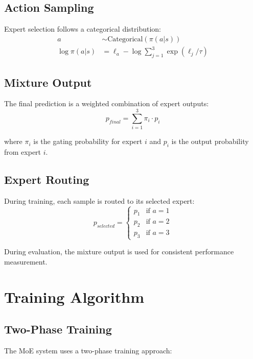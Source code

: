 \documentclass[11pt]{article}
\begin{document}
\subsection{Action Sampling}
Expert selection follows a categorical distribution:
\begin{align}
    a &\sim \text{Categorical}(\pi(a|s)) \\
    \log \pi(a|s) &= \ell_a - \log \sum_{j=1}^3 \exp(\ell_j/\tau)
\end{align}

\subsection{Mixture Output}
The final prediction is a weighted combination of expert outputs:
\begin{equation}
    p_{final} = \sum_{i=1}^3 \pi_i \cdot p_i
\end{equation}

where $\pi_i$ is the gating probability for expert $i$ and $p_i$ is the output probability from expert $i$.

\subsection{Expert Routing}
During training, each sample is routed to its selected expert:
\begin{equation}
    p_{selected} = \begin{cases}
        p_1 & \text{if } a = 1 \\
        p_2 & \text{if } a = 2 \\
        p_3 & \text{if } a = 3
    \end{cases}
\end{equation}

During evaluation, the mixture output is used for consistent performance measurement.

\section{Training Algorithm}

\subsection{Two-Phase Training}
The MoE system uses a two-phase training approach:
\end{document}
